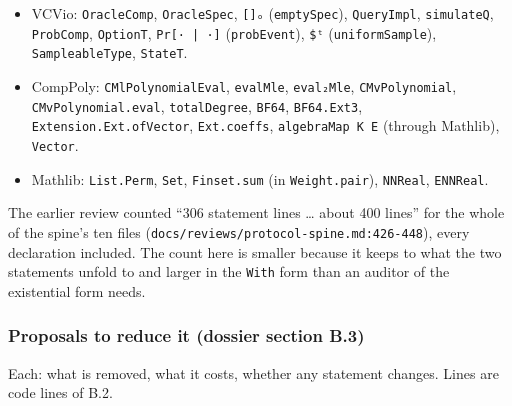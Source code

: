 \begin{itemize}
\texttt{Prover.\allowbreak{}run}, \texttt{Reduction.\allowbreak{}run} (through \texttt{perfectCompleteness}); \texttt{challengeQueryImpl}, \texttt{QueryImpl.\allowbreak{}addLift}.
\item VCVio: \texttt{OracleComp}, \texttt{OracleSpec}, \texttt{[]ₒ} (\texttt{emptySpec}), \texttt{QueryImpl}, \texttt{simulateQ}, \texttt{ProbComp}, \texttt{OptionT}, \texttt{Pr[· | ·]} (\texttt{probEvent}), \texttt{\$ᵗ} (\texttt{uniformSample}), \texttt{SampleableType}, \texttt{StateT}.
\item CompPoly: \texttt{CMlPolynomialEval}, \texttt{evalMle}, \texttt{eval₂Mle}, \texttt{CMvPolynomial}, \texttt{CMvPolynomial.\allowbreak{}eval}, \texttt{totalDegree}, \texttt{BF64}, \texttt{BF64.\allowbreak{}Ext3}, \texttt{Extension.\allowbreak{}Ext.\allowbreak{}ofVector}, \texttt{Ext.\allowbreak{}coeffs}, \texttt{algebraMap K E} (through Mathlib), \texttt{Vector}.
\item Mathlib: \texttt{List.\allowbreak{}Perm}, \texttt{Set}, \texttt{Finset.\allowbreak{}sum} (in \texttt{Weight.\allowbreak{}pair}), \texttt{NNReal}, \texttt{ENNReal}.
\end{itemize}

The earlier review counted \enquote{306 statement lines … about 400 lines} for the whole of the spine's ten files (\texttt{d\allowbreak{}o\allowbreak{}c\allowbreak{}s\allowbreak{}/\allowbreak{}r\allowbreak{}e\allowbreak{}v\allowbreak{}i\allowbreak{}e\allowbreak{}w\allowbreak{}s\allowbreak{}/\allowbreak{}p\allowbreak{}r\allowbreak{}o\allowbreak{}t\allowbreak{}o\allowbreak{}c\allowbreak{}o\allowbreak{}l\allowbreak{}-{}\allowbreak{}s\allowbreak{}p\allowbreak{}i\allowbreak{}n\allowbreak{}e\allowbreak{}.\allowbreak{}m\allowbreak{}d\allowbreak{}:\allowbreak{}4\allowbreak{}2\allowbreak{}6\allowbreak{}-{}\allowbreak{}4\allowbreak{}4\allowbreak{}8}), every declaration included. The count here is smaller because it keeps to what the two statements unfold to and larger in the \texttt{With} form than an auditor of the existential form needs.

\subsubsection{Proposals to reduce it (dossier section B.3)}\label{sec:gen-spine-B3}

Each: what is removed, what it costs, whether any statement changes. Lines are code lines of B.2.

